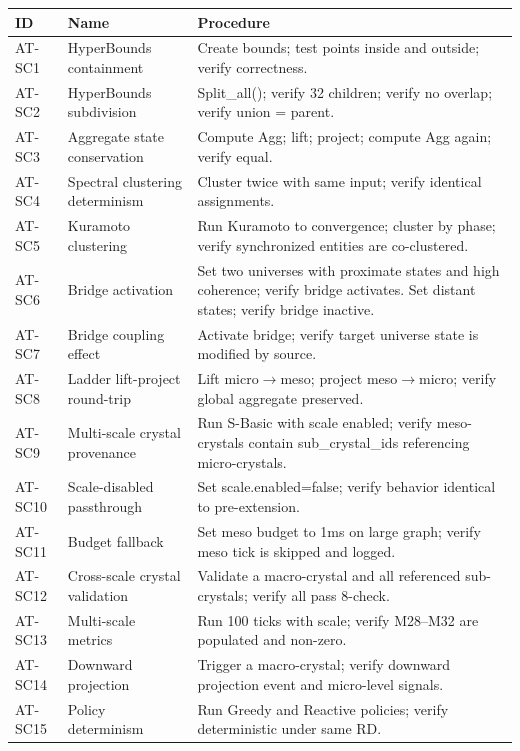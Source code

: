 \documentclass[11pt,a4paper,twoside]{article}
\theoremstyle{definition}
\theoremstyle{plain}
\theoremstyle{remark}
\begin{document}
\begin{longtable}{l l p{7cm}}
\toprule
\textbf{ID} & \textbf{Name} & \textbf{Procedure} \\
\midrule
\endfirsthead
\midrule
\endhead
\bottomrule
\endfoot
AT-SC1 & HyperBounds containment & Create bounds; test points inside
  and outside; verify correctness. \\
AT-SC2 & HyperBounds subdivision & Split\_all(); verify 32 children;
  verify no overlap; verify union = parent. \\
AT-SC3 & Aggregate state conservation & Compute Agg; lift; project;
  compute Agg again; verify equal. \\
AT-SC4 & Spectral clustering determinism & Cluster twice with same
  input; verify identical assignments. \\
AT-SC5 & Kuramoto clustering & Run Kuramoto to convergence; cluster
  by phase; verify synchronized entities are co-clustered. \\
AT-SC6 & Bridge activation & Set two universes with proximate states
  and high coherence; verify bridge activates. Set distant states;
  verify bridge inactive. \\
AT-SC7 & Bridge coupling effect & Activate bridge; verify target
  universe state is modified by source. \\
AT-SC8 & Ladder lift-project round-trip & Lift micro$\to$meso;
  project meso$\to$micro; verify global aggregate preserved. \\
AT-SC9 & Multi-scale crystal provenance & Run S-Basic with scale
  enabled; verify meso-crystals contain sub\_crystal\_ids referencing
  micro-crystals. \\
AT-SC10 & Scale-disabled passthrough & Set scale.enabled=false;
  verify behavior identical to pre-extension. \\
AT-SC11 & Budget fallback & Set meso budget to 1ms on large graph;
  verify meso tick is skipped and logged. \\
AT-SC12 & Cross-scale crystal validation & Validate a macro-crystal
  and all referenced sub-crystals; verify all pass 8-check. \\
AT-SC13 & Multi-scale metrics & Run 100 ticks with scale; verify
  M28--M32 are populated and non-zero. \\
AT-SC14 & Downward projection & Trigger a macro-crystal; verify
  downward projection event and micro-level signals. \\
AT-SC15 & Policy determinism & Run Greedy and Reactive policies;
  verify deterministic under same RD. \\
\end{longtable}
\end{document}
